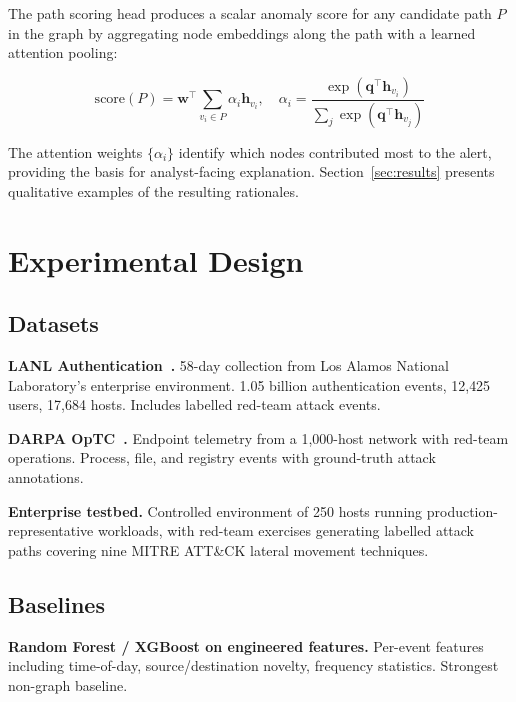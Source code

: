 \documentclass[sigconf,nonacm]{acmart}
\begin{document}
The path scoring head produces a scalar anomaly score for any candidate path
$P$ in the graph by aggregating node embeddings along the path with a
learned attention pooling:

\begin{equation}
  \mathrm{score}(P) = \mathbf{w}^\top \sum_{v_i \in P} \alpha_i \mathbf{h}_{v_i},\quad
  \alpha_i = \frac{\exp(\mathbf{q}^\top \mathbf{h}_{v_i})}{\sum_j \exp(\mathbf{q}^\top \mathbf{h}_{v_j})}
\end{equation}

The attention weights $\{\alpha_i\}$ identify which nodes contributed most
to the alert, providing the basis for analyst-facing explanation.
Section~\ref{sec:results} presents qualitative examples of the resulting
rationales.

\section{Experimental Design}
\label{sec:experiments}

\subsection{Datasets}

\textbf{LANL Authentication~\cite{kent2015lanl}.} 58-day collection from
Los Alamos National Laboratory's enterprise environment. 1.05 billion
authentication events, 12{,}425 users, 17{,}684 hosts. Includes labelled
red-team attack events.

\textbf{DARPA OpTC~\cite{darpa2020optc}.} Endpoint telemetry from a 1,000-host
network with red-team operations. Process, file, and registry events with
ground-truth attack annotations.

\textbf{Enterprise testbed.} Controlled environment of 250 hosts running
production-representative workloads, with red-team exercises generating
labelled attack paths covering nine MITRE ATT\&CK lateral movement techniques.

\subsection{Baselines}

\textbf{Random Forest / XGBoost on engineered features.} Per-event features
including time-of-day, source/destination novelty, frequency statistics.
Strongest non-graph baseline.
\end{document}
